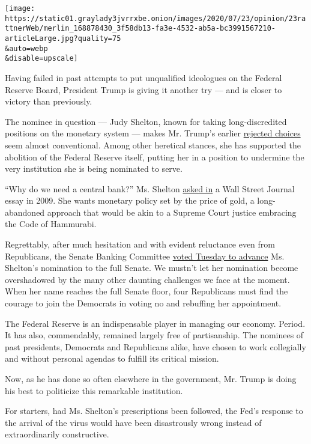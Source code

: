 \texttt{[image: https://static01.graylady3jvrrxbe.onion/images/2020/07/23/opinion/23rattnerWeb/merlin\_168878430\_3f58db13-fa3e-4532-ab5a-bc3991567210-articleLarge.jpg?quality=75\\\&auto=webp\\\&disable=upscale]}

Having failed in past attempts to put unqualified ideologues on the
Federal Reserve Board, President Trump is giving it another try --- and
is closer to victory than previously.

The nominee in question --- Judy Shelton, known for taking
long-discredited positions on the monetary system --- makes Mr. Trump's
earlier
\href{https://www.nytimes3xbfgragh.onion/2019/05/02/business/stephen-moore-fed.html}{rejected
choices} seem almost conventional. Among other heretical stances, she
has supported the abolition of the Federal Reserve itself, putting her
in a position to undermine the very institution she is being nominated
to serve.

``Why do we need a central bank?'' Ms. Shelton
\href{https://www.wsj.com/articles/SB123811225716453243}{asked in} a
Wall Street Journal essay in 2009. She wants monetary policy set by the
price of gold, a long-abandoned approach that would be akin to a Supreme
Court justice embracing the Code of Hammurabi.

Regrettably, after much hesitation and with evident reluctance even from
Republicans, the Senate Banking Committee
\href{https://www.nytimes3xbfgragh.onion/2020/07/21/business/economy/shelton-federal-reserve-trump-senate.html}{voted
Tuesday to advance} Ms. Shelton's nomination to the full Senate. We
mustn't let her nomination become overshadowed by the many other
daunting challenges we face at the moment. When her name reaches the
full Senate floor, four Republicans must find the courage to join the
Democrats in voting no and rebuffing her appointment.

The Federal Reserve is an indispensable player in managing our economy.
Period. It has also, commendably, remained largely free of partisanship.
The nominees of past presidents, Democrats and Republicans alike, have
chosen to work collegially and without personal agendas to fulfill its
critical mission.

Now, as he has done so often elsewhere in the government, Mr. Trump is
doing his best to politicize this remarkable institution.

For starters, had Ms. Shelton's prescriptions been followed, the Fed's
response to the arrival of the virus would have been disastrously wrong
instead of extraordinarily constructive.

